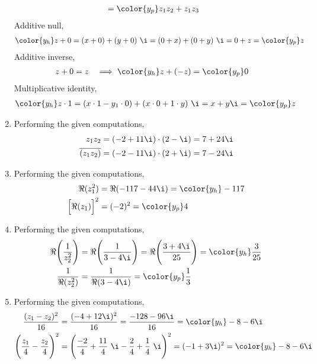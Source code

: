 \begin{enumerate}
\begin{align}
                             & = \color{y_p}z_1 z_2 + z_1 z_3
          \end{align}
          Additive null,
          \begin{align}
              \color{y_h}z + 0 & = (x + 0) + (y + 0)\ \i
              = (0 + x) + (0 + y)\ \i = 0 + z = \color{y_p}z
          \end{align}
          Additive inverse,
          \begin{align}
              z + 0 & = z & \implies \color{y_h}z + (-z) & = \color{y_p}0
          \end{align}
          Multiplicative identity,
          \begin{align}
              \color{y_h}z \cdot 1 &
              = (x \cdot 1 - y_1 \cdot 0) + (x \cdot 0 + 1 \cdot y)\ \i = x + y \i
              = \color{y_p}z
          \end{align}

    \item Performing the given computations,
          \begin{align}
              z_1z_2              & = (-2 + 11\i) \cdot (2 - \i) = 7 + 24 \i \\
              \overline{(z_1z_2)} & = (-2 - 11\i) \cdot (2 + \i) = 7 - 24 \i
          \end{align}

    \item Performing the given computations,
          \begin{align}
              \Re (z_1^2)           & = \Re (-117  - 44\i) = \color{y_h} -117 \\
              \Big[\Re (z_1)\Big]^2 & = (-2)^2 = \color{y_p} 4
          \end{align}

    \item Performing the given computations,
          \begin{align}
              \Re{\Bigg( \frac{1}{z_2^2} \Bigg)} & = \Re{\Bigg( \frac{1}{3 - 4\i}
                  \Bigg)} = \Re{\Bigg( \frac{3 + 4\i}{25} \Bigg)}
              = \color{y_h} \frac{3}{25}                                          \\
              \frac{1}{\Re{(z_2^2)}}             & = \frac{1}{\Re{(3 - 4\i)}}
              = \color{y_p} \frac{1}{3}
          \end{align}

    \item Performing the given computations,
          \begin{align}
              \frac{(z_1 - z_2)^2}{16} & = \frac{(-4 + 12\i)^2}{16}
              = \frac{-128 - 96\i}{16} = \color{y_h} -8 - 6\i                     \\
              \Bigg( \frac{z_1}{4}
              - \frac{z_2}{4} \Bigg)^2 & = \Biggl(\frac{-2}{4} + \frac{11}{4}\ \i
              - \frac{2}{4} + \frac{1}{4}\ \i\Biggr)^2 = (-1 + 3\i)^2
              = \color{y_h} -8 - 6\i
          \end{align}


\end{enumerate}
